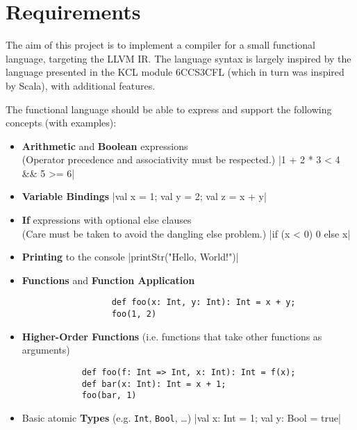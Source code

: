 \chapter{Requirements}
\label{sec:requirements}

The aim of this project is to implement a compiler for a small functional language, targeting the
LLVM IR. The language syntax is largely inspired by the language presented in the KCL module
6CCS3CFL (which in turn was inspired by Scala), with additional features.

The functional language should be able to express and support the following concepts (with
examples):

\begin{itemize}
      \item \textbf{Arithmetic} and \textbf{Boolean} expressions \\
            (Operator precedence and associativity must be respected.)
            |1 + 2 * 3 < 4 && 5 >= 6|

      \item \textbf{Variable Bindings}
            |val x = 1; val y = 2; val z = x + y|

      \item \textbf{If} expressions with optional else clauses \\
            (Care must be taken to avoid the dangling else problem.)
            |if (x < 0) 0 else x|

      \item \textbf{Printing} to the console
            |printStr("Hello, World!")|

      \item \textbf{Functions} and \textbf{Function Application}
            \begin{verbatim}
                  def foo(x: Int, y: Int): Int = x + y;
                  foo(1, 2)
            \end{verbatim}

      \item \textbf{Higher-Order Functions} (i.e. functions that take other functions as arguments)
            \begin{verbatim}
            def foo(f: Int => Int, x: Int): Int = f(x);
            def bar(x: Int): Int = x + 1;
            foo(bar, 1)
      \end{verbatim}

      \item Basic atomic \textbf{Types}
            (e.g. \texttt{Int}, \texttt{Bool}, \dots)
            |val x: Int = 1; val y: Bool = true|


\end{itemize}
